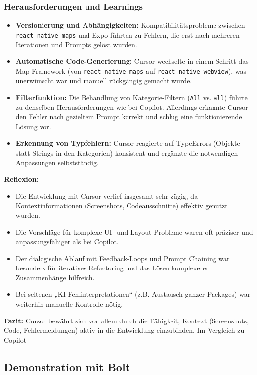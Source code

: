 \subsubsection{Herausforderungen und Learnings}
\begin{itemize}
    \item \textbf{Versionierung und Abhängigkeiten:} Kompatibilitätsprobleme zwischen \texttt{react-native-maps} und Expo führten zu Fehlern, die erst nach mehreren Iterationen und Prompts gelöst wurden.
    \item \textbf{Automatische Code-Generierung:} Cursor wechselte in einem Schritt das Map-Framework (von \texttt{react-native-maps} auf \texttt{react-native-webview}), was unerwünscht war und manuell rückgängig gemacht wurde.
    \item \textbf{Filterfunktion:} Die Behandlung von Kategorie-Filtern (\texttt{All} vs. \texttt{all}) führte zu denselben Herausforderungen wie bei Copilot. Allerdings erkannte Cursor den Fehler nach gezieltem Prompt korrekt und schlug eine funktionierende Lösung vor.
    \item \textbf{Erkennung von Typfehlern:} Cursor reagierte auf TypeErrors (Objekte statt Strings in den Kategorien) konsistent und ergänzte die notwendigen Anpassungen selbstständig.
\end{itemize}

\textbf{Reflexion:}
\begin{itemize}
    \item Die Entwicklung mit Cursor verlief insgesamt sehr zügig, da
          Kontextinformationen (Screenshots, Codeausschnitte) effektiv genutzt wurden.
    \item Die Vorschläge für komplexe UI- und Layout-Probleme waren oft präziser und
          anpassungsfähiger als bei Copilot.
    \item Der dialogische Ablauf mit Feedback-Loops und Prompt Chaining war besonders für
          iteratives Refactoring und das Lösen komplexerer Zusammenhänge hilfreich.
    \item Bei seltenen „KI-Fehlinterpretationen“ (z.B. Austausch ganzer Packages) war
          weiterhin manuelle Kontrolle nötig.
\end{itemize}

\textbf{Fazit:}
Cursor bewährt sich vor allem durch die Fähigkeit, Kontext (Screenshots, Code, Fehlermeldungen) aktiv in die Entwicklung einzubinden. Im Vergleich zu Copilot

\subsection{Demonstration mit Bolt}

